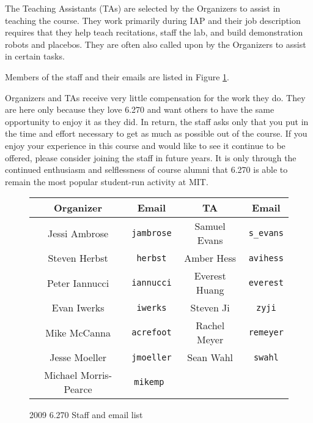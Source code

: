 The Teaching Assistants (TAs) are selected by the Organizers to assist in
teaching the course. They work primarily during IAP and their job description
requires that they help teach recitations, staff the lab, and build
demonstration robots and placebos. They are often also called upon by the
Organizers to assist in certain tasks.

Members of the staff and their emails are listed in Figure \ref{07stafflist}.

Organizers and TAs receive very little compensation for the work they do.  They
are here only because they love 6.270 and want others to have the same
opportunity to enjoy it as they did. In return, the staff asks only that you put
in the time and effort necessary to get as much as possible out of the course.
If you enjoy your experience in this course and would like to see it continue to
be offered, please consider joining the staff in future years. It is only
through the continued enthusiasm and selflessness of course alumni that 6.270 is
able to remain the most popular student-run activity at MIT.

\begin{figure}[htbp]
 \begin{center}
 \begin{tabular}{|c|c||c|c|}
  \hline
  


  \bf{Organizer}&   \bf{Email}& 					\bf{TA}&        	\bf{Email} \\
  \hline \hline
  Jessi Ambrose& 			\tt{jambrose}&      		Samuel Evans& 		  \tt{s\_evans}\\
  Steven Herbst& 		\tt{herbst}&     			Amber Hess& 		  \tt{avihess}\\
  Peter Iannucci&		\tt{iannucci}&				Everest Huang&       	\tt{everest}\\
  Evan Iwerks& 		\tt{iwerks}&  					Steven Ji&      	\tt{zyji}\\
  Mike McCanna&				\tt{acrefoot}&        		Rachel Meyer& 		\tt{remeyer}\\
  Jesse Moeller&   \tt{jmoeller}&					Sean Wahl& 		\tt{swahl}\\
  Michael Morris-Pearce& 	\tt{mikemp} & & \\		
  \hline
 \end{tabular}
 \end{center}
 \caption{2009 6.270 Staff and email list}
 \label{07stafflist}
\end{figure}

